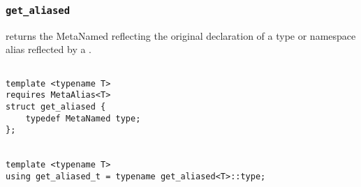 
\subsubsection{\texttt{get\_aliased}}

returns the MetaNamed reflecting the original declaration of a type or namespace alias reflected by a .

\begin{verbatim}

template <typename T>
requires MetaAlias<T>
struct get_aliased {
	typedef MetaNamed type;
};


template <typename T>
using get_aliased_t = typename get_aliased<T>::type;

\end{verbatim}

